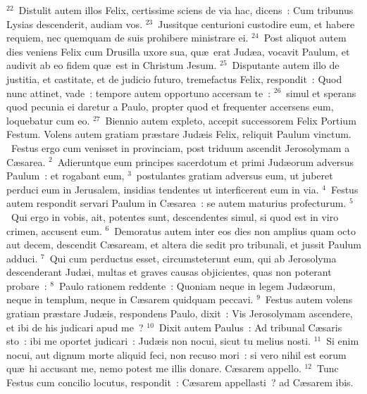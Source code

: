 ${}^{22}$~Distulit autem illos Felix, certissime sciens de via hac, dicens~: Cum tribunus Lysias descenderit, audiam vos.
${}^{23}$~Jussitque centurioni custodire eum, et habere requiem, nec quemquam de suis prohibere ministrare ei.
${}^{24}$~Post aliquot autem dies veniens Felix cum Drusilla uxore sua, qu\ae\ erat Jud\ae a, vocavit Paulum, et audivit ab eo fidem qu\ae\ est in Christum Jesum.
${}^{25}$~Disputante autem illo de justitia, et castitate, et de judicio futuro, tremefactus Felix, respondit~: Quod nunc attinet, vade~: tempore autem opportuno accersam te~:
${}^{26}$~simul et sperans quod pecunia ei daretur a Paulo, propter quod et frequenter accersens eum, loquebatur cum eo.
${}^{27}$~Biennio autem expleto, accepit successorem Felix Portium Festum. Volens autem gratiam pr\ae stare Jud\ae is Felix, reliquit Paulum vinctum.
~\lettrine[lines=10,image=true,loversize=0.05,lraise=-0.03]{F}{}estus ergo cum venisset in provinciam, post triduum ascendit Jerosolymam a C\ae sarea.
${}^{2}$~Adieruntque eum principes sacerdotum et primi Jud\ae orum adversus Paulum~: et rogabant eum,
${}^{3}$~postulantes gratiam adversus eum, ut juberet perduci eum in Jerusalem, insidias tendentes ut interficerent eum in via.
${}^{4}$~Festus autem respondit servari Paulum in C\ae sarea~: se autem maturius profecturum.
${}^{5}$~Qui ergo in vobis, ait, potentes sunt, descendentes simul, si quod est in viro crimen, accusent eum.
${}^{6}$~Demoratus autem inter eos dies non amplius quam octo aut decem, descendit C\ae saream, et altera die sedit pro tribunali, et jussit Paulum adduci.
${}^{7}$~Qui cum perductus esset, circumsteterunt eum, qui ab Jerosolyma descenderant Jud\ae i, multas et graves causas objicientes, quas non poterant probare~:
${}^{8}$~Paulo rationem reddente~: Quoniam neque in legem Jud\ae orum, neque in templum, neque in C\ae sarem quidquam peccavi.
${}^{9}$~Festus autem volens gratiam pr\ae stare Jud\ae is, respondens Paulo, dixit~: Vis Jerosolymam ascendere, et ibi de his judicari apud me~?
${}^{10}$~Dixit autem Paulus~: Ad tribunal C\ae saris sto~: ibi me oportet judicari~: Jud\ae is non nocui, sicut tu melius nosti.
${}^{11}$~Si enim nocui, aut dignum morte aliquid feci, non recuso mori~: si vero nihil est eorum qu\ae\ hi accusant me, nemo potest me illis donare. C\ae sarem appello.
${}^{12}$~Tunc Festus cum concilio locutus, respondit~: C\ae sarem appellasti~? ad C\ae sarem ibis.


